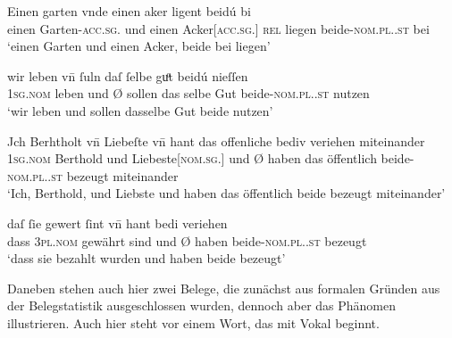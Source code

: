 \begin{exe}
\ex \label{ex:vvfinctrl}
	\begin{xlist}
	\ex \label{ex:vvfinctrl_1}
		\gll Einen garten vnde einen aker {} ligent beidú bi \textelp{} \\	
			einen Garten-\textsc{acc.sg.\MascI} und einen
				Acker[\textsc{acc.sg.\MascI}] \textsc{rel\subI} liegen
				beide-\textsc{nom.pl.\NeutI.st} bei {} \\
		\trans `einen Garten und einen Acker,  beide bei
			\textelp{} liegen'
			\parencites(Nr.~3249, Freiburg i.\,Br., 1299)[417,4--5]{cao4}

	\ex \label{ex:vvfinctrl_2}
		\gll wir leben \textelp{} vn̄ {} ſuln daſ ſelbe guͦt beidú nieſſen \\
			\textsc{1sg\subMF.nom} leben {} und Ø\subMF{} sollen das selbe Gut
				beide-\textsc{nom.pl.\NeutMF.st} nutzen \\
		\trans `wir leben \textelp{} und  sollen
			dasselbe Gut beide nutzen'
			\parencites(Nr.~3376, Neuenburg am Rhein, Kr.~Breisgau-Hochschwarzwald, 1299)[493,21--22]{cao4}

	\ex \label{ex:vvfinctrl_3}
		\gll Jch Berhtholt vn̄ Liebeſte \textelp{} vn̄ {} hant das offenliche
				bediv veriehen miteinander \\
			\textsc{1sg\subM.nom} Berthold und Liebeste[\textsc{nom.sg.\FemF}]
				{} und Ø\subMF{} haben das öffentlich
				beide-\textsc{nom.pl.\NeutMF.st} bezeugt miteinander \\
		\trans `Ich, Berthold, und Liebste \textelp{} und 
			haben das öffentlich beide bezeugt miteinander'
			\parencites(Nr.~N~150, Kl.~Niedermünster, Dépt.~Bas-Rhin, 1277)[108,31--32]{cao5}

	\ex \label{ex:vvfinctrl_4}
		\gll daſ ſie gewert ſint \textelp{} vn̄ {} hant bedi veriehen \\
			dass \textsc{3pl\subMF.nom} gewährt sind {} und Ø\subMF{} haben
				beide-\textsc{nom.pl.\NeutMF.st} bezeugt \\
		\trans `dass sie bezahlt wurden \textelp{} und  haben
			beide bezeugt'
			\parencites(Nr.~N~202, Straßburg, 1281)[156,16]{cao5}
	\end{xlist}
\end{exe}

Daneben stehen auch hier zwei Belege, die zunächst aus formalen Gründen aus der
Beleg\-statistik ausgeschlossen wurden, dennoch aber das Phänomen illustrieren.
Auch hier steht  vor einem Wort, das mit Vokal beginnt.


